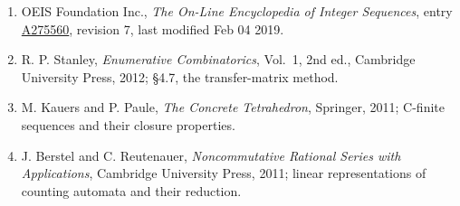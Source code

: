 \documentclass[11pt]{article}
\theoremstyle{definition}
\begin{document}
\begin{enumerate}

\item OEIS Foundation Inc., \emph{The On-Line Encyclopedia of Integer Sequences}, entry \href{https://oeis.org/A275560}{A275560}, revision 7, last modified Feb 04 2019.

\item R. P. Stanley, \emph{Enumerative Combinatorics}, Vol.~1, 2nd ed., Cambridge University Press, 2012; \S4.7, the transfer-matrix method.

\item M. Kauers and P. Paule, \emph{The Concrete Tetrahedron}, Springer, 2011; C-finite sequences and their closure properties.

\item J. Berstel and C. Reutenauer, \emph{Noncommutative Rational Series with Applications}, Cambridge University Press, 2011; linear representations of counting automata and their reduction.

\end{enumerate}
\end{document}
